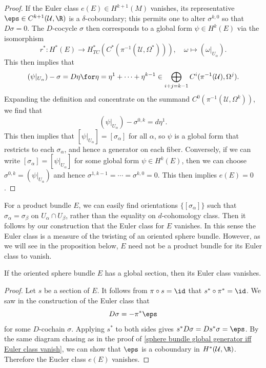 \begin{proof}
If the Euler class $e(E)\in H^{k+1}(M)$ vanishes, its representative $\eps\in C^{k+1}(\mathcal{U},\R)$ is a $\delta$-coboundary; this permits one to alter 
$\sigma^{k,0}$ so that $D\sigma=0$. The $D$-cocycle $\sigma$ then corresponds to a global form $\psi\in H^{k}(E)$ via the isomorphism 
\[r^*:H^*(E)\to H^*_{TC}(C^*(\pi^{-1}(\mathcal{U},\Omega^*))),\quad \omega\mapsto(\omega|_{U_\alpha}).\]
This then implies that
\[(\psi|_{U_\alpha})-\sigma=D\eta\for \eta=\eta^1+\cdots+\eta^{k-1}\in\bigoplus_{i+j=k-1}C^i(\pi^{-1}(\mathcal{U}),\Omega^j).\]
Expanding the definition and concentrate on the summand $C^0(\pi^{-1}(\mathcal{U},\Omega^k))$, we find that
\[(\psi|_{U_\alpha})-\sigma^{0,k}=d\eta^1.\]
This then implies that $[\psi|_{U_\alpha}]=[\sigma_\alpha]$ for all $\alpha$, so $\psi$ is a global form that restricts to each $\sigma_\alpha$, and hence a generator on 
each fiber. Conversely, if we can write $[\sigma_\alpha]=[\psi|_{U_\alpha}]$ for some global form $\psi\in H^k(E)$, then we can choose $\sigma^{0,k}=(\psi|_{U_\alpha})$ and 
hence $\sigma^{1,k-1}=\cdots=\sigma^{k,0}=0$. This then implies $e(E)=0$.
\end{proof}
For a product bundle $E$, we can easily find orientations $\{[\sigma_\alpha]\}$ such that $\sigma_\alpha=\sigma_\beta$ on $U_\alpha\cap U_\beta$, rather than the equality 
on $d$-cohomology class. Then it follows by our construction that the Euler class for $E$ vanishes. In this sense the Euler class is a measure of the twisting of an oriented sphere 
bundle. However, as we will see in the proposition below, $E$ need not be a product bundle for its Euler class to vanish.
\begin{proposition}
If the oriented sphere bundle $E$ has a global section, then its Euler class vanishes.
\end{proposition}
\begin{proof}
Let $s$ be a section of $E$. It follows from $\pi\circ s=\id$ that $s^*\circ\pi^*=\id$. We saw in the construction of the Euler class that 
\[D\sigma=-\pi^*\eps\]
for some $D$-cochain $\sigma$. Applying $s^*$ to both sides gives $s^*D\sigma=Ds^*\sigma=\eps$. By the same diagram chasing as in the proof of 
\cref{sphere bundle global generator iff Euler class vanish}, we can show that $\eps$ is a coboundary in $H^*(\mathcal{U},\R)$. Therefore the Eucler class 
$e(E)$ vanishes.
\end{proof}
